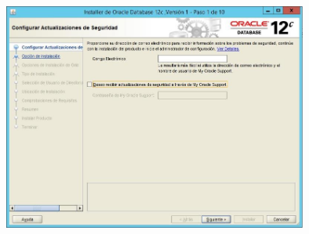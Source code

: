 \begin{enumerate}[1.]
	\begin{center}
	\includegraphics[width=10cm]{./Imagenes/jhordy8} 
	\end{center}


\end{enumerate}
